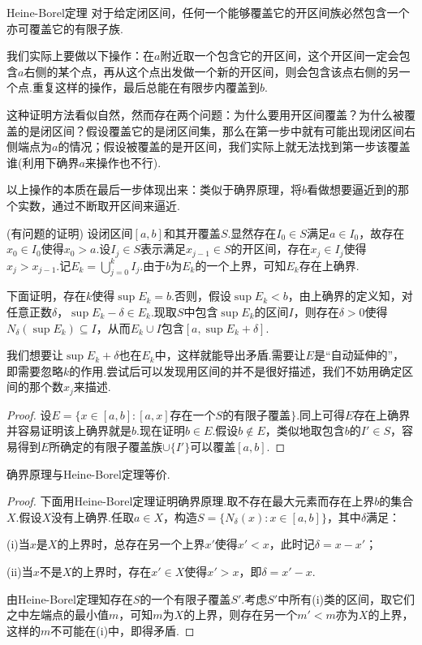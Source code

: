 \documentclass[lang=cn, zihao=5]{elegantbook}
\begin{document}
\begin{theorem}{Heine-Borel定理}
	对于给定闭区间，任何一个能够覆盖它的开区间族必然包含一个亦可覆盖它的有限子族.
\end{theorem}
\begin{hint}
	我们实际上要做以下操作：在$a$附近取一个包含它的开区间，这个开区间一定会包含$a$右侧的某个点，再从这个点出发做一个新的开区间，则会包含该点右侧的另一个点.重复这样的操作，最后总能在有限步内覆盖到$b$.
	
	这种证明方法看似自然，然而存在两个问题：为什么要用开区间覆盖？为什么被覆盖的是闭区间？假设覆盖它的是闭区间集，那么在第一步中就有可能出现闭区间右侧端点为$a$的情况；假设被覆盖的是开区间，我们实际上就无法找到第一步该覆盖谁(利用下确界$a$来操作也不行).
	
	以上操作的本质在最后一步体现出来：类似于确界原理，将$b$看做想要逼近到的那个实数，通过不断取开区间来逼近.
\end{hint}
\begin{hint}
	(有问题的证明)
	设闭区间$[a,b]$和其开覆盖$S$.显然存在$I_0 \in S$满足$a \in I_0$，故存在$x_0 \in I_0$使得$x_0>a$.设$I_j \in S$表示满足$x_{j-1} \in S$的开区间，存在$x_j \in I_j$使得$x_j>x_{j-1}$.记$E_k=\bigcup_{j=0}^{k} I_j$.由于$b$为$E_k$的一个上界，可知$E_k$存在上确界.
	
	下面证明，存在$k$使得$\sup E_k=b$.否则，假设$\sup E_k<b$，由上确界的定义知，对任意正数$\delta$，$\sup E_k - \delta \in E_k$.现取$S$中包含$\sup E_k$的区间$I$，则存在$\delta >0$使得$N_{\delta}(\sup E_k) \subseteq I$，从而$E_k \cup I$包含$[a,\sup E_k+\delta]$.
	
	我们想要让$\sup E_k + \delta$也在$E_k$中，这样就能导出矛盾.需要让$E$是“自动延伸的”，即需要忽略$k$的作用.尝试后可以发现用区间的并不是很好描述，我们不妨用确定区间的那个数$x_j$来描述.
\end{hint}
\begin{proof}
	设$E=\{ x \in [a,b]:[a,x]\text{存在一个$S$的有限子覆盖} \}$.同上可得$E$存在上确界并容易证明该上确界就是$b$.现在证明$b \in E$.假设$b \notin E$，类似地取包含$b$的$I' \in S$，容易得到$E$所确定的有限子覆盖族$\cup \{ I' \}$可以覆盖$[a,b]$.
\end{proof}

\begin{proposition}
	确界原理与Heine-Borel定理等价.
\end{proposition}
\begin{proof}
	下面用Heine-Borel定理证明确界原理.取不存在最大元素而存在上界$b$的集合$X$.假设$X$没有上确界.任取$a \in X$，构造$S=\{ N_{\delta}(x):x \in [a,b] \}$，其中$\delta$满足：
	
	(i)当$x$是$X$的上界时，总存在另一个上界$x'$使得$x'<x$，此时记$\delta =x-x'$；
	
	(ii)当$x$不是$X$的上界时，存在$x' \in X$使得$x'>x$，即$\delta = x'-x$.
	
	由Heine-Borel定理知存在$S$的一个有限子覆盖$S'$.考虑$S'$中所有(i)类的区间，取它们之中左端点的最小值$m$，可知$m$为$X$的上界，则存在另一个$m'<m$亦为$X$的上界，这样的$m$不可能在(i)中，即得矛盾.
\end{proof}
\end{document}
